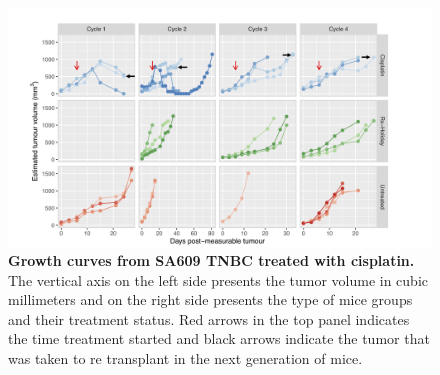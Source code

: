 

\begin{figure}
\centering
\includegraphics[width=\textwidth]{Figures/SA609allcyclescisplatin.png}
	
\caption[Representative growth curves from SA609 TNBC treated with cisplatin]
	{\small
	\textbf{Growth curves from SA609 TNBC treated with cisplatin.}
	   The vertical axis on the left side presents the tumor volume in cubic millimeters and on the right side presents the type of mice groups and their treatment status. Red arrows in the top panel indicates the time treatment started and black arrows indicate the tumor that was taken to re transplant in the next generation of mice.
	}
	\label{fig:SA609allcyclescisplatin}
\end{figure}




